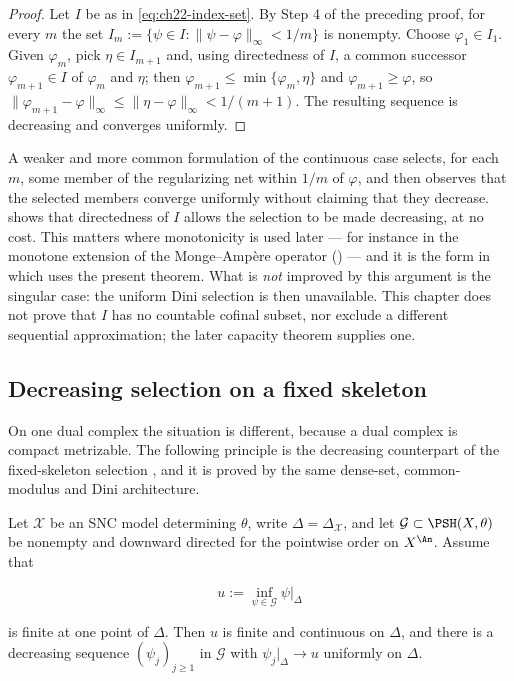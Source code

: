 \begin{proof}
Let $I$ be as in \eqref{eq:ch22-index-set}.  By Step 4 of the preceding
proof, for every $m$ the set
$I_m:=\{\psi\in I:\|\psi-\varphi\|_\infty<1/m\}$ is nonempty.  Choose
$\varphi_1\in I_1$.  Given $\varphi_{m}$, pick $\eta\in I_{m+1}$ and,
using directedness of $I$, a common successor
$\varphi_{m+1}\in I$ of $\varphi_m$ and $\eta$; then
$\varphi_{m+1}\leq\min\{\varphi_m,\eta\}$ and
$\varphi_{m+1}\geq\varphi$, so
$\|\varphi_{m+1}-\varphi\|_\infty\leq\|\eta-\varphi\|_\infty<1/(m+1)$.
The resulting sequence is decreasing and converges uniformly.
\end{proof}

\begin{remark}
\label{rem:ch22-decreasing-selection-improvement}
A weaker and more common formulation of the continuous case selects, for
each $m$, some member of the regularizing net within $1/m$ of
$\varphi$, and then observes that the selected members converge uniformly
without claiming that they decrease.  
shows that directedness of $I$ allows the selection to be made decreasing,
at no cost.  This matters where monotonicity is used later --- for instance
in the monotone extension of the Monge--Amp\`ere operator
() --- and it is the form in which
 uses the present theorem.  What is
\emph{not} improved by this argument is the singular case: the uniform
Dini selection is then unavailable.  This chapter does not prove that $I$
has no countable cofinal subset, nor exclude a different sequential
approximation; the later capacity theorem supplies one.
\end{remark}

\subsection{Decreasing selection on a fixed skeleton}

On one dual complex the situation is different, because a dual complex is
compact metrizable.  The following principle is the decreasing counterpart
of the fixed-skeleton selection ,
and it is proved by the same dense-set, common-modulus and Dini
architecture.

\begin{proposition}
\label{prop:ch22-fixed-skeleton-decreasing}
Let $\mathcal X$ be an SNC model determining $\theta$, write
$\Delta=\Delta_{\mathcal X}$, and let
$\mathcal G\subset\PSH(X,\theta)$ be nonempty and downward directed for
the pointwise order on $X^{\An}$.  Assume that

\[
 u:=\inf_{\psi\in\mathcal G}\psi|_\Delta
\]

is finite at one point of $\Delta$.  Then $u$ is finite and continuous
on $\Delta$, and there is a decreasing sequence
$(\psi_j)_{j\geq1}$ in $\mathcal G$ with
$\psi_j|_\Delta\to u$ uniformly on $\Delta$.
\end{proposition}

